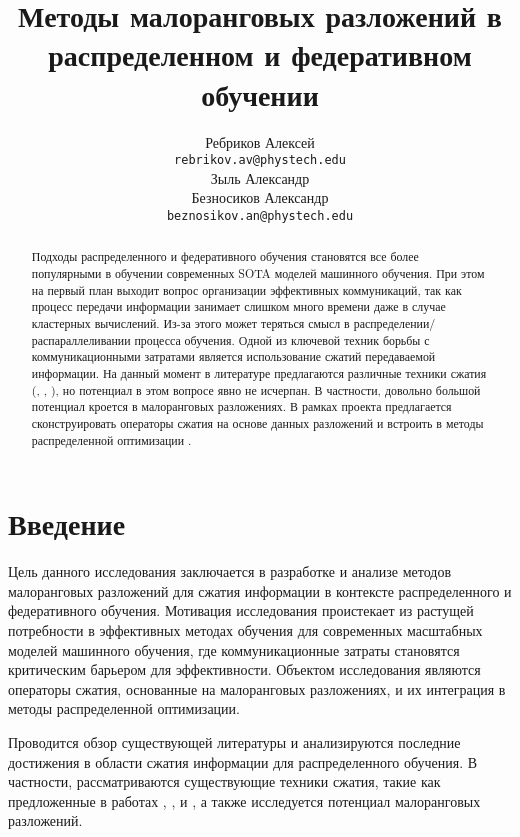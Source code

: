 \documentclass{article}
\title{Методы малоранговых разложений в распределенном и федеративном обучении}
\author{ Ребриков Алексей \\
	\texttt{rebrikov.av@phystech.edu} \\
	\And
	Зыль Александр\\
	\And 
	Безносиков Александр\\
	\texttt{beznosikov.an@phystech.edu} \\
}
\date{}
\begin{document}
\maketitle

\begin{abstract}
	Подходы распределенного и федеративного обучения становятся все более популярными в обучении современных SOTA моделей машинного обучения. При этом на первый план выходит вопрос организации эффективных коммуникаций, так как процесс передачи информации занимает слишком много времени даже в случае кластерных вычислений. Из-за этого может теряться смысл в распределении/распараллеливании процесса обучения. Одной из ключевой техник  борьбы с коммуникационными затратами является использование сжатий передаваемой информации. На данный момент в литературе предлагаются различные техники сжатия (\citep{beznosikov2023biased}, \citep{alistarh2017qsgd}, \citep{horvoth2022natural}), но потенциал в этом вопросе явно не исчерпан. В частности, довольно большой потенциал кроется в малоранговых разложениях. В рамках проекта предлагается сконструировать операторы сжатия на основе данных разложений и встроить в методы распределенной оптимизации \citep{richtarik2021ef21}.
\end{abstract}



\section{Введение}

Цель данного исследования заключается в разработке и анализе методов малоранговых разложений для сжатия информации в контексте распределенного и федеративного обучения. Мотивация исследования проистекает из растущей потребности в эффективных методах обучения для современных масштабных моделей машинного обучения, где коммуникационные затраты становятся критическим барьером для эффективности. Объектом исследования являются операторы сжатия, основанные на малоранговых разложениях, и их интеграция в методы распределенной оптимизации. 

Проводится обзор существующей литературы и анализируются последние достижения в области сжатия информации для распределенного обучения. В частности, рассматриваются существующие техники сжатия, такие как предложенные в работах \citep{beznosikov2023biased}, \citep{alistarh2017qsgd}, и \citep{horvoth2022natural}, а также исследуется потенциал малоранговых разложений.
\end{document}
